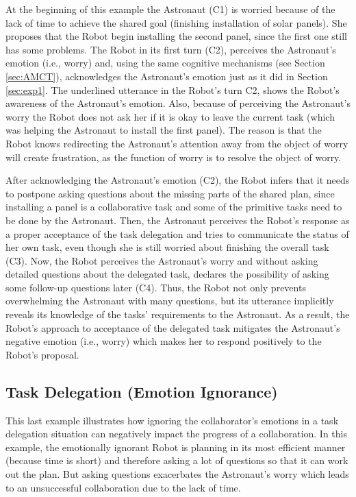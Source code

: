 At the beginning of this example the Astronaut (C1) is worried because of the
lack of time to achieve the shared goal (finishing installation of solar
panels). She proposes that the Robot begin installing the second panel, since
the first one still has some problems. The Robot in its first turn (C2),
perceives the Astronaut's emotion (i.e., worry) and, using the same cognitive
mechanisms (see Section \ref{sec:AMCT}), acknowledges the Astronaut's emotion
just as it did in Section \ref{sec:exp1}. The underlined utterance in the
Robot's turn C2, shows the Robot's awareness of the Astronaut's emotion. Also,
because of perceiving the Astronaut's worry the Robot does not ask her if it is
okay to leave the current task (which was helping the Astronaut to install the
first panel). The reason is that the Robot knows redirecting the Astronaut's
attention away from the object of worry will create frustration, as the function
of worry is to resolve the object of worry.

After acknowledging the Astronaut's emotion (C2), the Robot infers that it needs
to postpone asking questions about the missing parts of the shared plan, since
installing a panel is a collaborative task and some of the primitive tasks need
to be done by the Astronaut. Then, the Astronaut perceives the Robot's response
as a proper acceptance of the task delegation and tries to communicate the
status of her own task, even though she is still worried about finishing the
overall task (C3). Now, the Robot perceives the Astronaut's worry and without
asking detailed questions about the delegated task, declares the possibility of
asking some follow-up questions later (C4). Thus, the Robot not only prevents
overwhelming the Astronaut with many questions, but its utterance implicitly
reveals its knowledge of the tasks' requirements to the Astronaut. As a result,
the Robot's approach to acceptance of the delegated task mitigates the
Astronaut's negative emotion (i.e., worry) which makes her to respond positively
to the Robot's proposal.

\subsection{Task Delegation (Emotion Ignorance)}
\label{sec:exp4}

This last example illustrates how ignoring the collaborator's emotions in a task
delegation situation can negatively impact the progress of a collaboration. In
this example, the emotionally ignorant Robot is planning in its most efficient
manner (because time is short) and therefore asking a lot of questions so that
it can work out the plan. But asking questions exacerbates the Astronaut's worry
which leads to an unsuccessful collaboration due to the lack of time.

